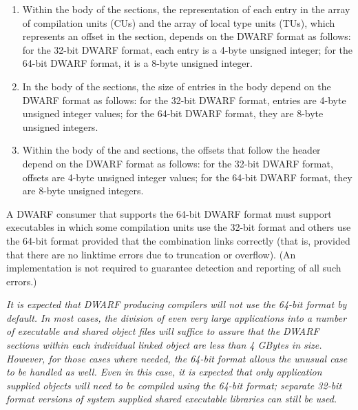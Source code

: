 \begin{enumerate}[1. ]
\item Within the body of the \dotdebugnames{} 
sections, the representation of each entry in the array of
compilation units (CUs) and the array of local type units
(TUs), which represents an offset in the 
\dotdebuginfo{}
section, depends on the DWARF format as follows: 
\bb
for
\eb
the 32-bit DWARF format, each entry is a 4-byte unsigned integer;
\bb
for
\eb
the 64-bit DWARF format, it is a 8-byte unsigned integer.

\item In the body of the \dotdebugstroffsets{} 
sections, the size of entries in the body depend on the DWARF
format as follows: 
\bb
for
\eb
the 32-bit DWARF format, entries are 4-byte unsigned integer values; 
\bb
for
\eb
the 64-bit DWARF format, they are 8-byte unsigned integers.

\item Within the body of the \dotdebugloclists{} and \dotdebugrnglists{}
sections, the offsets 
\bb
that 
\eb
follow the header depend on the
DWARF format as follows: 
\bb
for
\eb
the 32-bit DWARF format, offsets are 4-byte unsigned integer values; 
\bb
for
\eb
the 64-bit DWARF format, they are 8-byte unsigned integers.

\end{enumerate}

\bbpareb

A DWARF consumer that supports the 64-bit DWARF format must
support executables in which some compilation units use the
32-bit format and others use the 64-bit format provided that
the combination links correctly (that is, provided that there
are no link\dash time errors due to truncation or overflow). 
(An implementation is not required to guarantee detection and
reporting of all such errors.)

\textit{It is expected that DWARF producing compilers will \emph{not} use
the 64-bit format \emph{by default}. In most cases, the division of
even very large applications into a number of executable and
shared object files will suffice to assure that the DWARF sections
within each individual linked object are less than 4 GBytes
in size. However, for those cases where needed, the 64-bit
format allows the unusual case to be handled as well. Even
in this case, it is expected that only application supplied
objects will need to be compiled using the 64-bit format;
separate 32-bit format versions of system supplied shared
executable libraries can still be used.}


